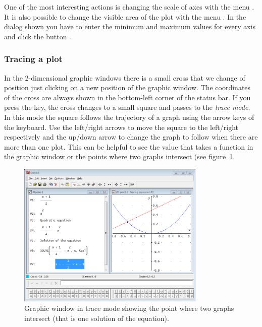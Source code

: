 One of the most interesting actions is changing the scale of axes with the menu .
It is also possible to change the visible area of the plot with the menu . 
In the dialog shown you have to enter the minimum and maximum values for every axis and click the button .


\subsubsection*{Tracing a plot}

In the 2-dimensional graphic windows there is a small cross that we change of position just clicking on a new position of the graphic window.
The coordinates of the cross are always shown in the bottom-left corner of the status bar.
If you press the  key, the cross changes to a small square and passes to the \emph{trace mode}.
In this mode the square follows the trajectory of a graph using the arrow keys of the keyboard.
Use the left/right arrows to move the square to the left/right respectively and the up/down arrow to change the graph to follow when there are more than one plot. 
This can be helpful to see the value that takes a function in the graphic window or the points where two graphs intersect (see figure~\ref{g:trace-mode}.

\begin{figure}[h!]
\begin{center}
\includegraphics[width=0.8\textwidth]{img/introduction/trace_mode}
\caption{Graphic window in trace mode showing the point where two graphs intersect (that is one solution of the equation).}
\label{g:trace-mode}
\end{center}
\end{figure}


